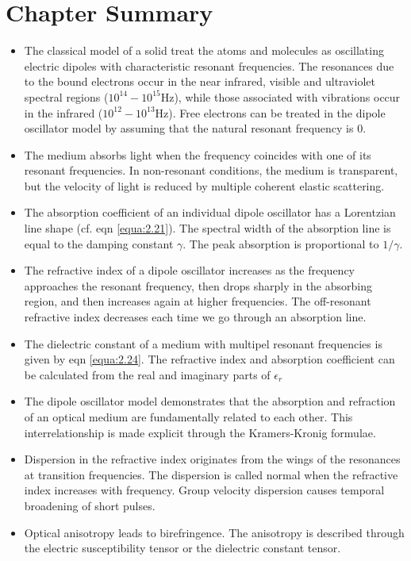 \documentclass[12pt]{book}
\begin{document}
\section*{Chapter  Summary}

\begin{shaded}
\begin{itemize}
  \item The classical model of a solid treat the atoms and molecules as oscillating electric dipoles with characteristic resonant frequencies. The resonances due to the bound electrons occur in the near infrared, visible and ultraviolet spectral regions ($10^{14}-10^{15}$Hz), while those associated with vibrations occur in the infrared ($10^{12}-10^{13}$Hz). Free electrons can be treated in the dipole oscillator model by assuming that the natural resonant frequency is 0.
  \item The medium absorbs light when the frequency coincides with one of its resonant frequencies. In non-resonant conditions, the medium is transparent, but the velocity of light is reduced by multiple coherent elastic scattering.
  \item The absorption coefficient of an individual dipole oscillator has a Lorentzian line shape (cf. eqn \ref{equa:2.21}). The spectral width of the absorption line is equal to the damping constant $\gamma$. The peak absorption is proportional to $1/\gamma$.
  \item The refractive index of a dipole oscillator increases as the frequency approaches the resonant frequency, then drops sharply in the absorbing region, and then increases again at higher frequencies. The off-resonant refractive index decreases each time we go through an absorption line.
  \item The dielectric constant of a medium with multipel resonant frequencies is given by eqn \ref{equa:2.24}. The refractive index and absorption coefficient can be calculated from the real and imaginary parts of $\epsilon_r$
  \item The dipole oscillator model demonstrates that the absorption and refraction of an optical medium are fundamentally related to each other. This interrelationship is made explicit through the Kramers-Kronig formulae.
  \item Dispersion in the refractive index originates from the wings of the resonances at transition frequencies. The dispersion is called normal when the refractive index increases with frequency. Group velocity dispersion causes temporal broadening of short pulses.
  \item Optical anisotropy leads to birefringence. The anisotropy is described through the electric susceptibility tensor or the dielectric constant tensor.
\end{itemize}
\end{shaded}
\end{document}
